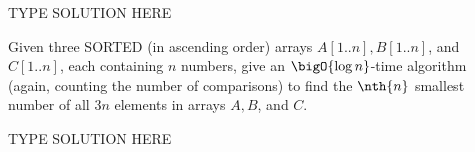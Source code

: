 \documentclass[final]{article}
\begin{document}
\begin{solution}
    TYPE SOLUTION HERE
\end{solution}

\begin{exercise}{5.9}
    Given three SORTED (in ascending order) arrays $A[1..n], B[1..n]$,
    and $C[1..n]$, each containing $n$ numbers, give an $\bigO{\log n}$-time algorithm (again, counting the number of comparisons) to find the $\nth{n}$ smallest number of all $3n$
    elements in arrays $A, B$, and $C$.
\end{exercise}

\begin{solution}
    TYPE SOLUTION HERE
\end{solution}
\end{document}
